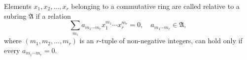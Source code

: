 Elements $x_1, x_2, \ldots, x_r$ belonging to a commutative ring are called  relative to a subring $\mathfrak{A}$ if a relation
$$\sum_{m_i} a_{m_1 \cdots m_r} x_1^{m_1} \cdots x_r^{m_r} = 0, \quad a_{m_1 \cdots m_r} \in \mathfrak{A},$$
where $(m_1, m_2, \ldots, m_r)$ is an $r$-tuple of non-negative integers, can hold only if every $a_{m_1 \cdots m_r} = 0$.
